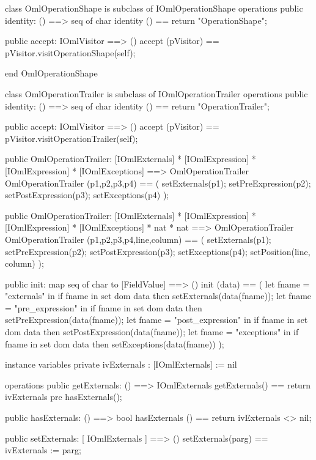 \begin{vdm_al}
class OmlOperationShape is subclass of IOmlOperationShape
operations
  public identity: () ==> seq of char
  identity () == return "OperationShape";

  public accept: IOmlVisitor ==> ()
  accept (pVisitor) == pVisitor.visitOperationShape(self);

end OmlOperationShape
\end{vdm_al}
\begin{vdm_al}
class OmlOperationTrailer is subclass of IOmlOperationTrailer
operations
  public identity: () ==> seq of char
  identity () == return "OperationTrailer";

  public accept: IOmlVisitor ==> ()
  accept (pVisitor) == pVisitor.visitOperationTrailer(self);

  public OmlOperationTrailer:
    [IOmlExternals] *
    [IOmlExpression] *
    [IOmlExpression] *
    [IOmlExceptions] ==> OmlOperationTrailer
  OmlOperationTrailer (p1,p2,p3,p4) == 
    ( setExternals(p1);
      setPreExpression(p2);
      setPostExpression(p3);
      setExceptions(p4) );

  public OmlOperationTrailer:
    [IOmlExternals] *
    [IOmlExpression] *
    [IOmlExpression] *
    [IOmlExceptions] *
    nat *
    nat ==> OmlOperationTrailer
  OmlOperationTrailer (p1,p2,p3,p4,line,column) == 
    ( setExternals(p1);
      setPreExpression(p2);
      setPostExpression(p3);
      setExceptions(p4);
      setPosition(line, column) );

  public init: map seq of char to [FieldValue] ==> ()
  init (data) ==
    ( let fname = "externals" in
        if fname in set dom data
        then setExternals(data(fname));
      let fname = "pre_expression" in
        if fname in set dom data
        then setPreExpression(data(fname));
      let fname = "post_expression" in
        if fname in set dom data
        then setPostExpression(data(fname));
      let fname = "exceptions" in
        if fname in set dom data
        then setExceptions(data(fname)) );

instance variables
  private ivExternals : [IOmlExternals] := nil

operations
  public getExternals: () ==> IOmlExternals
  getExternals() == return ivExternals
    pre hasExternals();

  public hasExternals: () ==> bool
  hasExternals () == return ivExternals <> nil;

  public setExternals: [ IOmlExternals ] ==> ()
  setExternals(parg) == ivExternals := parg;


\end{vdm_al}
